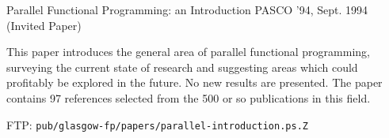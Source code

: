 {Parallel Functional Programming: an Introduction}
{PASCO '94, Sept. 1994 (Invited Paper)}

This paper introduces the general area of parallel functional
programming, surveying the current state of research and suggesting
areas which could profitably be explored in the future.  No new
results are presented.  The paper contains 97 references selected from
the 500 or so publications in this field.

FTP: {\tt pub/glasgow-fp/papers/parallel-introduction.ps.Z}









